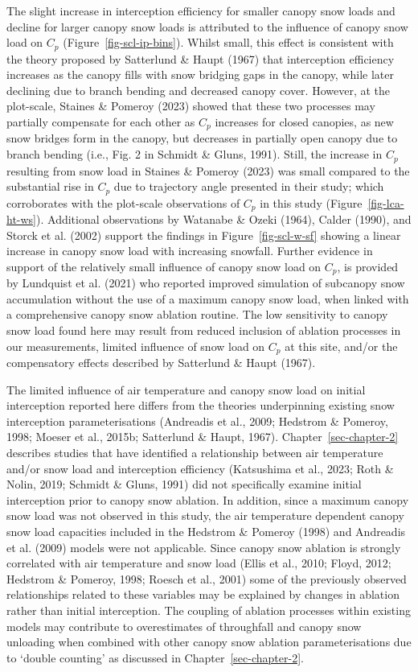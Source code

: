 \documentclass[
  letterpaper,
]{tex/uofsthesis-cs}
\begin{document}
The slight increase in interception efficiency for smaller canopy snow
loads and decline for larger canopy snow loads is attributed to the
influence of canopy snow load on \(C_p\) (Figure~\ref{fig-scl-ip-bins}).
Whilst small, this effect is consistent with the theory proposed by
Satterlund \& Haupt (1967) that interception efficiency increases as the
canopy fills with snow bridging gaps in the canopy, while later
declining due to branch bending and decreased canopy cover. However, at
the plot-scale, Staines \& Pomeroy (2023) showed that these two
processes may partially compensate for each other as \(C_p\) increases
for closed canopies, as new snow bridges form in the canopy, but
decreases in partially open canopy due to branch bending (i.e., Fig. 2
in Schmidt \& Gluns, 1991). Still, the increase in \(C_p\) resulting
from snow load in Staines \& Pomeroy (2023) was small compared to the
substantial rise in \(C_p\) due to trajectory angle presented in their
study; which corroborates with the plot-scale observations of \(C_p\) in
this study (Figure~\ref{fig-lca-ht-ws}). Additional observations by
Watanabe \& Ozeki (1964), Calder (1990), and Storck et al. (2002)
support the findings in Figure~\ref{fig-scl-w-sf} showing a linear
increase in canopy snow load with increasing snowfall. Further evidence
in support of the relatively small influence of canopy snow load on
\(C_p\), is provided by Lundquist et al. (2021) who reported improved
simulation of subcanopy snow accumulation without the use of a maximum
canopy snow load, when linked with a comprehensive canopy snow ablation
routine. The low sensitivity to canopy snow load found here may result
from reduced inclusion of ablation processes in our measurements,
limited influence of snow load on \(C_p\) at this site, and/or the
compensatory effects described by Satterlund \& Haupt (1967).

The limited influence of air temperature and canopy snow load on initial
interception reported here differs from the theories underpinning
existing snow interception parameterisations (Andreadis et al., 2009;
Hedstrom \& Pomeroy, 1998; Moeser et al., 2015b; Satterlund \& Haupt,
1967). Chapter~\ref{sec-chapter-2} describes studies that have
identified a relationship between air temperature and/or snow load and
interception efficiency (Katsushima et al., 2023; Roth \& Nolin, 2019;
Schmidt \& Gluns, 1991) did not specifically examine initial
interception prior to canopy snow ablation. In addition, since a maximum
canopy snow load was not observed in this study, the air temperature
dependent canopy snow load capacities included in the Hedstrom \&
Pomeroy (1998) and Andreadis et al. (2009) models were not applicable.
Since canopy snow ablation is strongly correlated with air temperature
and snow load (Ellis et al., 2010; Floyd, 2012; Hedstrom \& Pomeroy,
1998; Roesch et al., 2001) some of the previously observed relationships
related to these variables may be explained by changes in ablation
rather than initial interception. The coupling of ablation processes
within existing models may contribute to overestimates of throughfall
and canopy snow unloading when combined with other canopy snow ablation
parameterisations due to `double counting' as discussed in
Chapter~\ref{sec-chapter-2}.
\end{document}
